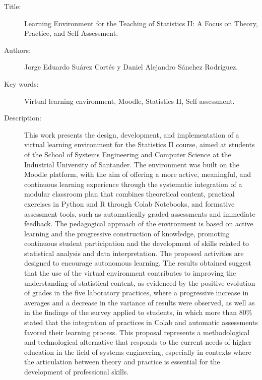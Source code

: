 \documentclass[letter,oneside,12pt,spanish]{report}
\begin{document}
\footnotesize{
\begin{description}
  \item[Title:] Learning Environment for the Teaching of Statistics II: A Focus on Theory, Practice, and Self-Assessment.
  \item[Authors:] Jorge Eduardo Suárez Cortés y Daniel Alejandro Sánchez Rodríguez.
  \item[Key words:] Virtual learning environment, Moodle, Statistics II, Self-assessment.
  \item[Description:] {
    \begin{spacing}{1.9}
	This work presents the design, development, and implementation of a virtual learning environment for the Statistics II course, aimed at students of the School of Systems Engineering and Computer Science at the Industrial University of Santander. The environment was built on the Moodle platform, with the aim of offering a more active, meaningful, and continuous learning experience through the systematic integration of a modular classroom plan that combines theoretical content, practical exercises in Python and R through Colab Notebooks, and formative assessment tools, such as automatically graded assessments and immediate feedback.  
	The pedagogical approach of the environment is based on active learning and the progressive construction of knowledge, promoting continuous student participation and the development of skills related to statistical analysis and data interpretation. The proposed activities are designed to encourage autonomous learning. The results obtained suggest that the use of the virtual environment contributes to improving the understanding of statistical content, as evidenced by the positive evolution of grades in the five laboratory practices, where a progressive increase in averages and a decrease in the variance of results were observed, as well as in the findings of the survey applied to students, in which more than 80\% stated that the integration of practices in Colab and automatic assessments favored their learning process.  
    This proposal represents a methodological and technological alternative that responds to the current needs of higher education in the field of systems engineering, especially in contexts where the articulation between theory and practice is essential for the development of professional skills.
	\end{spacing}
  }
\end{description}}\normalsize
\end{document}
